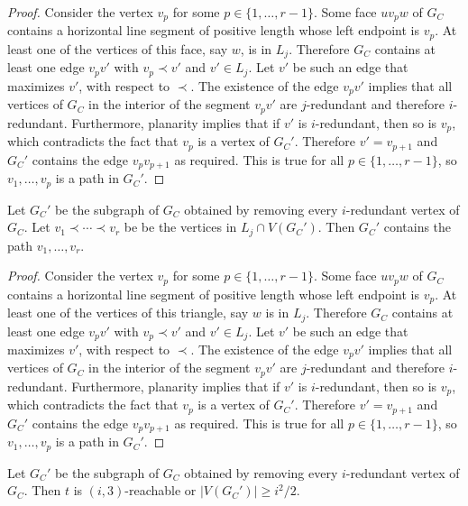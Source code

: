\documentclass{patmorin}
\begin{document}
\begin{proof}
  Consider the vertex $v_p$ for some $p\in\{1,\ldots,r-1\}$. Some face $uv_pw$ of $G_C$ contains a horizontal line segment of positive length whose left endpoint is $v_p$.  At least one of the vertices of this face, say $w$, is in $L_j$. Therefore $G_C$ contains at least one edge $v_pv'$ with $v_p\prec v'$ and $v'\in L_j$.  Let $v'$ be such an edge that maximizes $v'$, with respect to $\prec$.  The existence of the edge $v_pv'$ implies that all vertices of $G_C$ in the interior of the segment $v_pv'$ are $j$-redundant and therefore $i$-redundant.  Furthermore, planarity implies that if $v'$ is $i$-redundant, then so is $v_p$, which contradicts the fact that $v_p$ is a vertex of $G_C'$.  Therefore $v'=v_{p+1}$ and $G_C'$ contains the edge $v_pv_{p+1}$ as required.  This is true for all $p\in\{1,\ldots,r-1\}$, so $v_1,\ldots,v_p$ is a path in $G_C'$.
\end{proof}


\begin{clm}
   Let $G_C'$ be the subgraph of $G_C$ obtained by removing every $i$-redundant vertex of $G_C$.  Let $v_1\prec\cdots\prec v_r$ be be the vertices in $L_j\cap V(G_C')$.  Then $G_C'$ contains the path $v_1,\ldots,v_r$.
\end{clm}

\begin{proof}
  Consider the vertex $v_p$ for some $p\in\{1,\ldots,r-1\}$. Some face $uv_pw$ of $G_C$ contains a horizontal line segment of positive length whose left endpoint is $v_p$.  At least one of the vertices of this triangle, say $w$ is in $L_j$. Therefore $G_C$ contains at least one edge $v_pv'$ with $v_p\prec v'$ and $v'\in L_j$.  Let $v'$ be such an edge that maximizes $v'$, with respect to $\prec$.  The existence of the edge $v_pv'$ implies that all vertices of $G_C$ in the interior of the segment $v_pv'$ are $j$-redundant and therefore $i$-redundant.  Furthermore, planarity implies that if $v'$ is $i$-redundant, then so is $v_p$, which contradicts the fact that $v_p$ is a vertex of $G_C'$.  Therefore $v'=v_{p+1}$ and $G_C'$ contains the edge $v_pv_{p+1}$ as required.  This is true for all $p\in\{1,\ldots,r-1\}$, so $v_1,\ldots,v_p$ is a path in $G_C'$.
\end{proof}


\begin{clm}\label{bam}
  Let $G_C'$ be the subgraph of $G_C$ obtained by removing every $i$-redundant vertex of $G_C$.  Then $t$ is $(i,3)$-reachable or $|V(G_C')|\ge i^2/2$.
\end{clm}
\end{document}
